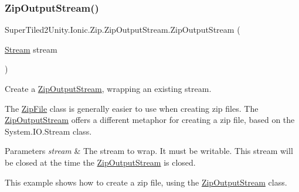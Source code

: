 \subsubsection{\texorpdfstring{Zip\+Output\+Stream()}{ZipOutputStream()}\hspace{0.1cm}{\footnotesize\ttfamily [1/3]}}
{\footnotesize\ttfamily Super\+Tiled2\+Unity.\+Ionic.\+Zip.\+Zip\+Output\+Stream.\+Zip\+Output\+Stream (\begin{DoxyParamCaption}\item[{\mbox{\hyperlink{namespace_super_tiled2_unity_1_1_ionic_1_1_zip_a9ced5352c56e7e0fceff15b534073c83aeae835e83c0494a376229f254f7d3392}{Stream}}}]{stream }\end{DoxyParamCaption})}



Create a \mbox{\hyperlink{class_super_tiled2_unity_1_1_ionic_1_1_zip_1_1_zip_output_stream}{Zip\+Output\+Stream}}, wrapping an existing stream. 

The \mbox{\hyperlink{class_super_tiled2_unity_1_1_ionic_1_1_zip_1_1_zip_file}{Zip\+File}} class is generally easier to use when creating zip files. The \mbox{\hyperlink{class_super_tiled2_unity_1_1_ionic_1_1_zip_1_1_zip_output_stream}{Zip\+Output\+Stream}} offers a different metaphor for creating a zip file, based on the System.\+I\+O.\+Stream class. 


\begin{DoxyParams}{Parameters}
{\em stream} & The stream to wrap. It must be writable. This stream will be closed at the time the \mbox{\hyperlink{class_super_tiled2_unity_1_1_ionic_1_1_zip_1_1_zip_output_stream}{Zip\+Output\+Stream}} is closed. \\
\hline
\end{DoxyParams}


This example shows how to create a zip file, using the \mbox{\hyperlink{class_super_tiled2_unity_1_1_ionic_1_1_zip_1_1_zip_output_stream}{Zip\+Output\+Stream}} class.


